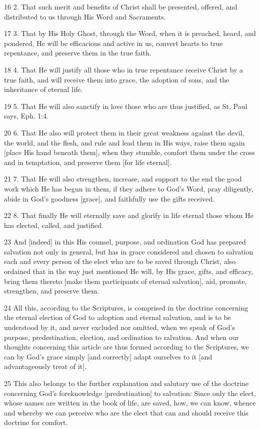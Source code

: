 {16 2. That such merit and benefits of Christ shall be presented, offered, and distributed to us through His Word and Sacraments.

17 3. That by His Holy Ghost, through the Word, when it is preached, heard, and pondered, He will be efficacious and active in us, convert hearts to true repentance, and preserve them in the true faith.

18 4. That He will justify all those who in true repentance receive Christ by a true faith, and will receive them into grace, the adoption of sons, and the inheritance of eternal life.

19 5. That He will also sanctify in love those who are thus justified, as St. Paul says, Eph. 1:4.

20 6. That He also will protect them in their great weakness against the devil, the world, and the flesh, and rule and lead them in His ways, raise them again [place His hand beneath them], when they stumble, comfort them under the cross and in temptation, and preserve them [for life eternal].

21 7. That He will also strengthen, increase, and support to the end the good work which He has begun in them, if they adhere to God’s Word, pray diligently, abide in God’s goodness [grace], and faithfully use the gifts received.

22 8. That finally He will eternally save and glorify in life eternal those whom He has elected, called, and justified.

23 And [indeed] in this His counsel, purpose, and ordination God has prepared salvation not only in general, but has in grace considered and chosen to salvation each and every person of the elect who are to be saved through Christ, also ordained that in the way just mentioned He will, by His grace, gifts, and efficacy, bring them thereto [make them participants of eternal salvation], aid, promote, strengthen, and preserve them.

24 All this, according to the Scriptures, is comprised in the doctrine concerning the eternal election of God to adoption and eternal salvation, and is to be understood by it, and never excluded nor omitted, when we speak of God’s purpose, predestination, election, and ordination to salvation. And when our thoughts concerning this article are thus formed according to the Scriptures, we can by God’s grace simply [and correctly] adapt ourselves to it [and advantageously treat of it].

25 This also belongs to the further explanation and salutary use of the doctrine concerning God’s foreknowledge [predestination] to salvation: Since only the elect, whose names are written in the book of life, are saved, how, we can know, whence and whereby we can perceive who are the elect that can and should receive this doctrine for comfort.

}
